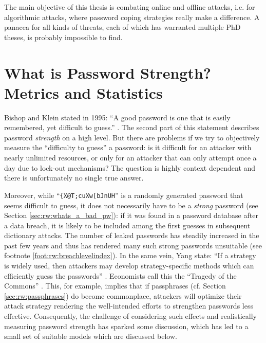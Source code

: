 

The main objective of this thesis is combating online and offline attacks, i.e. for algorithmic attacks, where password coping strategies really make a difference. A panacea for all kinds of threats, each of which has warranted multiple PhD theses, is probably impossible to find. 



\section{What is Password Strength? Metrics and Statistics}\label{sec:rw:pw_strength_metrics}
Bishop and Klein stated in 1995: ``A good password is one that is easily remembered, yet difficult to guess.'' \cite[p. 231]{Bishop1995ProactivePasswordChecking}. The second part of this statement describes password \textit{strength} on a high level. But there are problems if we try to objectively measure the ``difficulty to guess'' a password: is it difficult for an attacker with nearly unlimited resources, or only for an attacker that can only attempt once a day due to lock-out mechanisms? The question is highly context dependent and there is unfortunately no single true answer. 

Moreover, while ``\texttt{\{X@T;cuXw[bJnUH}'' is a randomly generated password that seems difficult to guess, it does not necessarily have to be a \textit{strong} password (see Section \ref{sec:rw:whats_a_bad_pw}): if it was found in a password database after a data breach, it is likely to be included among the first guesses in subsequent dictionary attacks. The number of leaked passwords has steadily increased in the past few years and thus has rendered many such strong passwords unsuitable (see footnote \ref{foot:rw:breachlevelindex}). In the same vein, Yang \etal state: ``If a strategy is widely used, then attackers may develop strategy-specific methods which can efficiently guess the passwords'' \cite{Yang2016MnemonicSentenceBased}. Economists call this the ``Tragedy of the Commons'' \cite{Hardin1968TragedyCommons}. This, for example, implies that if passphrases (cf. Section \ref{sec:rw:passphrases}) do become commonplace, attackers will optimize their attack strategy rendering the well-intended efforts to strengthen passwords less effective. Consequently, the challenge of considering such effects and realistically measuring password strength has sparked some discussion, which has led to a small set of suitable models which are discussed below.



